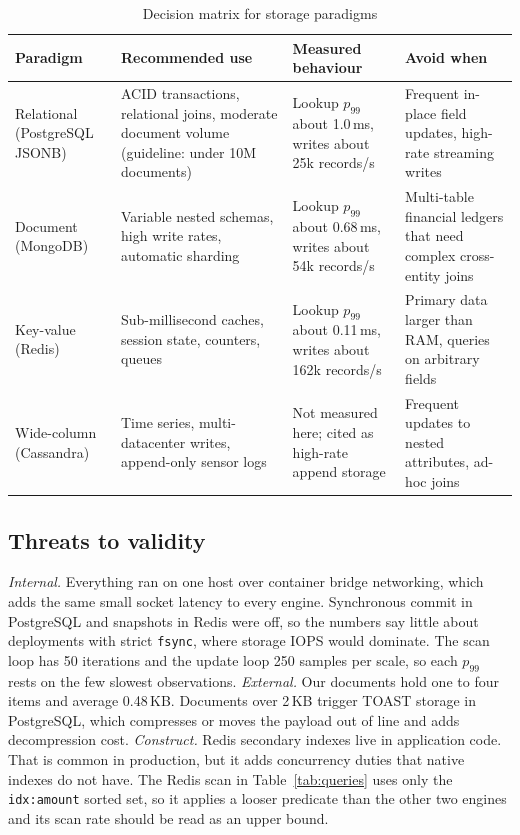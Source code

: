 \documentclass[conference,a4paper]{IEEEtran}
\newcommand{\code}[1]{\texttt{\small #1}}
\begin{document}
\begin{table}[t]
\caption{Decision matrix for storage paradigms}
\label{tab:decision}
\centering
\footnotesize
\begin{tabularx}{\textwidth}{@{}p{2.4cm}XXX@{}}
\toprule
Paradigm & Recommended use & Measured behaviour & Avoid when \\
\midrule
Relational (PostgreSQL JSONB) & ACID transactions, relational joins, moderate document volume (guideline: under 10M documents) & Lookup $p_{99}$ about 1.0\,ms, writes about 25k records/s & Frequent in-place field updates, high-rate streaming writes \\
Document (MongoDB) & Variable nested schemas, high write rates, automatic sharding & Lookup $p_{99}$ about 0.68\,ms, writes about 54k records/s & Multi-table financial ledgers that need complex cross-entity joins \\
Key-value (Redis) & Sub-millisecond caches, session state, counters, queues & Lookup $p_{99}$ about 0.11\,ms, writes about 162k records/s & Primary data larger than RAM, queries on arbitrary fields \\
Wide-column (Cassandra) & Time series, multi-datacenter writes, append-only sensor logs & Not measured here; cited as high-rate append storage & Frequent updates to nested attributes, ad-hoc joins \\
\bottomrule
\end{tabularx}
\end{table}

\subsection{Threats to validity}
\emph{Internal.} Everything ran on one host over container bridge networking, which adds the same small socket latency to every engine. Synchronous commit in PostgreSQL and snapshots in Redis were off, so the numbers say little about deployments with strict \code{fsync}, where storage IOPS would dominate. The scan loop has 50 iterations and the update loop 250 samples per scale, so each $p_{99}$ rests on the few slowest observations. \emph{External.} Our documents hold one to four items and average 0.48\,KB. Documents over 2\,KB trigger TOAST storage in PostgreSQL, which compresses or moves the payload out of line and adds decompression cost. \emph{Construct.} Redis secondary indexes live in application code. That is common in production, but it adds concurrency duties that native indexes do not have. The Redis scan in Table~\ref{tab:queries} uses only the \code{idx:amount} sorted set, so it applies a looser predicate than the other two engines and its scan rate should be read as an upper bound.
\end{document}

